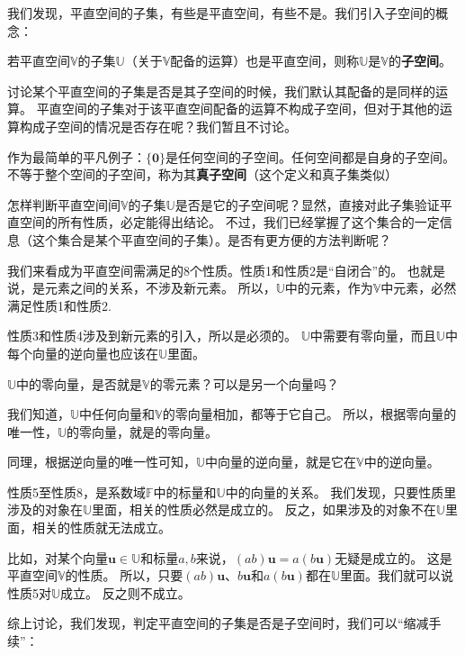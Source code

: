 \documentclass[12pt,UTF8]{ctexbook}
\begin{document}
我们发现，平直空间的子集，有些是平直空间，有些不是。我们引入子空间的概念：
\begin{df}\label{df:1_2}
    若平直空间$\mathbb{V}$的子集$\mathbb{U}$（关于$\mathbb{V}$配备的运算）也是平直空间，则称$\mathbb{U}$是$\mathbb{V}$的{\bfseries 子空间}。
\end{df}

讨论某个平直空间的子集是否是其子空间的时候，我们默认其配备的是同样的运算。
平直空间的子集对于该平直空间配备的运算不构成子空间，但对于其他的运算构成子空间的情况是否存在呢？我们暂且不讨论。

作为最简单的平凡例子：$\{\mathbf{0}\}$是任何空间的子空间。任何空间都是自身的子空间。不等于整个空间的子空间，称为其{\bfseries 真子空间}（这个定义和真子集类似）

怎样判断平直空间间$\mathbb{V}$的子集$\mathbb{U}$是否是它的子空间呢？显然，直接对此子集验证平直空间的所有性质，必定能得出结论。
不过，我们已经掌握了这个集合的一定信息（这个集合是某个平直空间的子集）。是否有更方便的方法判断呢？

我们来看成为平直空间需满足的8个性质。性质1和性质2是“自闭合”的。
也就是说，是元素之间的关系，不涉及新元素。
所以，$\mathbb{U}$中的元素，作为$\mathbb{V}$中元素，必然满足性质1和性质2.

性质3和性质4涉及到新元素的引入，所以是必须的。
$\mathbb{U}$中需要有零向量，而且$\mathbb{U}$中每个向量的逆向量也应该在$\mathbb{U}$里面。

$\mathbb{U}$中的零向量，是否就是$\mathbb{V}$的零元素？可以是另一个向量吗？

我们知道，$\mathbb{U}$中任何向量和$\mathbb{V}$的零向量相加，都等于它自己。
所以，根据零向量的唯一性，$\mathbb{U}$的零向量，就是$\mathbb{}$的零向量。

同理，根据逆向量的唯一性可知，$\mathbb{U}$中向量的逆向量，就是它在$\mathbb{V}$中的逆向量。

性质5至性质8，是系数域$\mathbb{F}$中的标量和$\mathbb{U}$中的向量的关系。
我们发现，只要性质里涉及的对象在$\mathbb{U}$里面，相关的性质必然是成立的。
反之，如果涉及的对象不在$\mathbb{U}$里面，相关的性质就无法成立。

比如，对某个向量$\mathbf{u} \in \mathbb{U}$和标量$a, b$来说，$(ab)\mathbf{u} = a(b\mathbf{u})$无疑是成立的。
这是平直空间$\mathbb{V}$的性质。
所以，只要$(ab)\mathbf{u}$、$b\mathbf{u}$和$a(b\mathbf{u})$都在$\mathbb{U}$里面。我们就可以说性质5对$\mathbb{U}$成立。
反之则不成立。

综上讨论，我们发现，判定平直空间的子集是否是子空间时，我们可以“缩减手续”：
\end{document}
